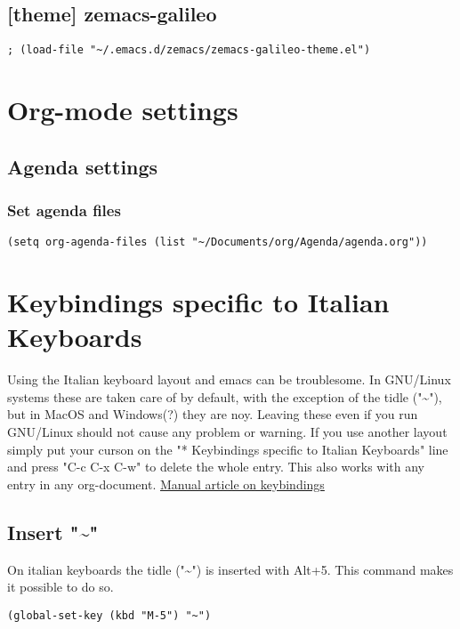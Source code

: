 \documentclass[11pt]{article}
\begin{document}
\subsection{[theme] zemacs-galileo}
\label{sec:org158a48a}
\begin{verbatim}
; (load-file "~/.emacs.d/zemacs/zemacs-galileo-theme.el")
\end{verbatim}

\section{Org-mode settings}
\label{sec:org73353b0}
\subsection{Agenda settings}
\label{sec:org3751bb8}
\subsubsection{Set agenda files}
\label{sec:org953e317}
\begin{verbatim}
(setq org-agenda-files (list "~/Documents/org/Agenda/agenda.org"))
\end{verbatim}
\section{Keybindings specific to Italian Keyboards}
\label{sec:orgd8270e5}
Using the Italian keyboard layout and emacs can be troublesome. 
In GNU/Linux systems these are taken care of by default, with the exception of the tidle ("\textasciitilde{}"),  but in MacOS and Windows(?) they are noy. 
Leaving these even if you run GNU/Linux should not cause any problem or warning.
If you use another layout simply put your curson on the "* Keybindings specific to Italian Keyboards" line and press "C-c C-x C-w" to delete the whole entry. This also works with any entry in any org-document.
\href{https://www.gnu.org/software/emacs/manual/html\_node/elisp/Key-Binding-Commands.html}{Manual article on keybindings}
\subsection{Insert "\textasciitilde{}"}
\label{sec:org14ade60}
On italian keyboards the tidle ("\textasciitilde{}") is inserted with Alt+5. This command makes it possible to do so.
\begin{verbatim}
(global-set-key (kbd "M-5") "~")
\end{verbatim}
\end{document}
